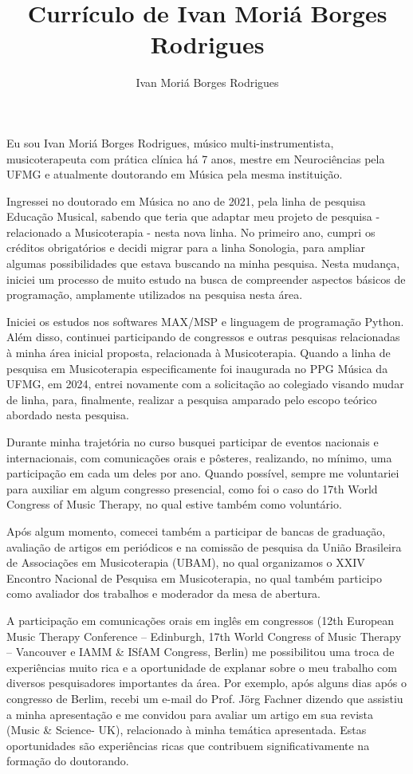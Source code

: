\documentclass[a4paper,12pt]{article}
\begin{document}
\title{Currículo de Ivan Moriá Borges Rodrigues}
\author{Ivan Moriá Borges Rodrigues}
\date{}
\maketitle

\begin{doublespace}

\noindent
Eu sou Ivan Moriá Borges Rodrigues, músico multi-instrumentista, musicoterapeuta com prática clínica há 7 anos, mestre em Neurociências pela UFMG e atualmente doutorando em Música pela mesma instituição.

\medskip
Ingressei no doutorado em Música no ano de 2021, pela linha de pesquisa Educação Musical, sabendo que teria que adaptar meu projeto de pesquisa - relacionado a Musicoterapia - nesta nova linha. No primeiro ano, cumpri os créditos obrigatórios e decidi migrar para a linha Sonologia, para ampliar algumas possibilidades que estava buscando na minha pesquisa. Nesta mudança, iniciei um processo de muito estudo na busca de compreender aspectos básicos de programação, amplamente utilizados na pesquisa nesta área.

\medskip
Iniciei os estudos nos softwares MAX/MSP e linguagem de programação Python. Além disso, continuei participando de congressos e outras pesquisas relacionadas à minha área inicial proposta, relacionada à Musicoterapia. Quando a linha de pesquisa em Musicoterapia especificamente foi inaugurada no PPG Música da UFMG, em 2024, entrei novamente com a solicitação ao colegiado visando mudar de linha, para, finalmente, realizar a pesquisa amparado pelo escopo teórico abordado nesta pesquisa.

\medskip
Durante minha trajetória no curso busquei participar de eventos nacionais e internacionais, com comunicações orais e pôsteres, realizando, no mínimo, uma participação em cada um deles por ano. Quando possível, sempre me voluntariei para auxiliar em algum congresso presencial, como foi o caso do 17th World Congress of Music Therapy, no qual estive também como voluntário.

\medskip
Após algum momento, comecei também a participar de bancas de graduação, avaliação de artigos em periódicos e na comissão de pesquisa da União Brasileira de Associações em Musicoterapia (UBAM), no qual organizamos o XXIV Encontro Nacional de Pesquisa em Musicoterapia, no qual também participo como avaliador dos trabalhos e moderador da mesa de abertura.

\medskip
A participação em comunicações orais em inglês em congressos (12th European Music Therapy Conference – Edinburgh, 17th World Congress of Music Therapy – Vancouver e IAMM \& ISfAM Congress, Berlin) me possibilitou uma troca de experiências muito rica e a oportunidade de explanar sobre o meu trabalho com diversos pesquisadores importantes da área. Por exemplo, após alguns dias após o congresso de Berlim, recebi um e-mail do Prof. Jörg Fachner dizendo que assistiu a minha apresentação e me convidou para avaliar um artigo em sua revista (Music \& Science- UK), relacionado à minha temática apresentada. Estas oportunidades são experiências ricas que contribuem significativamente na formação do doutorando.


\end{doublespace}
\end{document}
